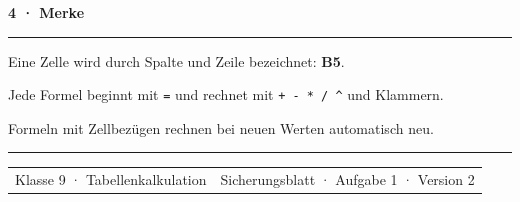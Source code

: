 \documentclass[10pt,a4paper]{article}
\newcommand{\sectiontitle}[1]{%
  \vspace{2.3mm}
  {\color{Blue}\bfseries\large #1}\par
  \vspace{0.8mm}
  {\color{Blue}\rule{\linewidth}{0.7pt}}\par
  \vspace{1.2mm}
}
\begin{document}
\sectiontitle{4 · Merke}

\begin{tcolorbox}[colback=Mint,colframe=Blue!40,arc=3mm,boxrule=0.7pt,
  left=3mm,right=3mm,top=2mm,bottom=2mm]
  Eine Zelle wird durch Spalte und Zeile bezeichnet: \textbf{B5}.\par
  \vspace{1.2mm}
  Jede Formel beginnt mit \texttt{=} und rechnet mit
  \texttt{+ - * / \^{}} und Klammern.\par
  \vspace{1.2mm}
  Formeln mit Zellbezügen rechnen bei neuen Werten automatisch neu.
\end{tcolorbox}

\vfill
{\color{Line}\rule{\linewidth}{0.5pt}}\par
\vspace{1.5mm}
\begin{tabularx}{\linewidth}{@{}Xr@{}}
  {\small\color{Muted}Klasse 9 · Tabellenkalkulation} &
  {\small\color{Muted}Sicherungsblatt · Aufgabe 1 · Version 2}
\end{tabularx}
\end{document}
